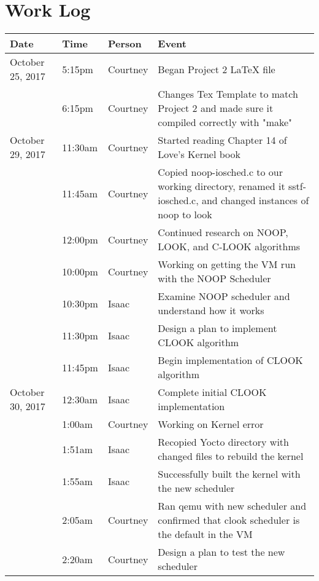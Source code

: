 \documentclass[letterpaper,10pt,draftclsnofoot,onecolumn,titlepage]{IEEEtran}
\begin{document}
\section{Work Log}
\begin{center}
\begin{tabular}{p{3cm}p{1cm}p{1cm}p{10cm} }
 Date  & Time & Person & Event \\ \hline
October 25, 2017 & 5:15pm & Courtney & Began Project 2 LaTeX file \\
		 & 6:15pm & Courtney & Changes Tex Template to match Project 2 and made sure it compiled correctly with "make" \\
October 29, 2017 & 11:30am & Courtney & Started reading Chapter 14 of Love's Kernel book \\                 
		 & 11:45am & Courtney & Copied noop-iosched.c to our working directory, renamed it sstf-iosched.c, and changed instances of noop to look \\ 
		 & 12:00pm & Courtney & Continued research on NOOP, LOOK, and C-LOOK algorithms \\
		 & 10:00pm & Courtney & Working on getting the VM run with the NOOP Scheduler \\
   		 & 10:30pm & Isaac & Examine NOOP scheduler and understand how it works \\
   		 & 11:30pm & Isaac & Design a plan to implement CLOOK algorithm \\
   		 & 11:45pm & Isaac & Begin implementation of CLOOK algorithm \\
October 30, 2017 & 12:30am & Isaac & Complete initial CLOOK implementation \\
		 & 1:00am & Courtney & Working on Kernel error \\
		 & 1:51am & Isaac & Recopied Yocto directory with changed files to rebuild the kernel \\
		 & 1:55am & Isaac & Successfully built the kernel with the new scheduler \\
		 & 2:05am & Courtney & Ran qemu with new scheduler and confirmed that clook scheduler is the default in the VM \\
   		 & 2:20am & Courtney & Design a plan to test the new scheduler \\
\end{tabular}
\end{center}
\end{document}
